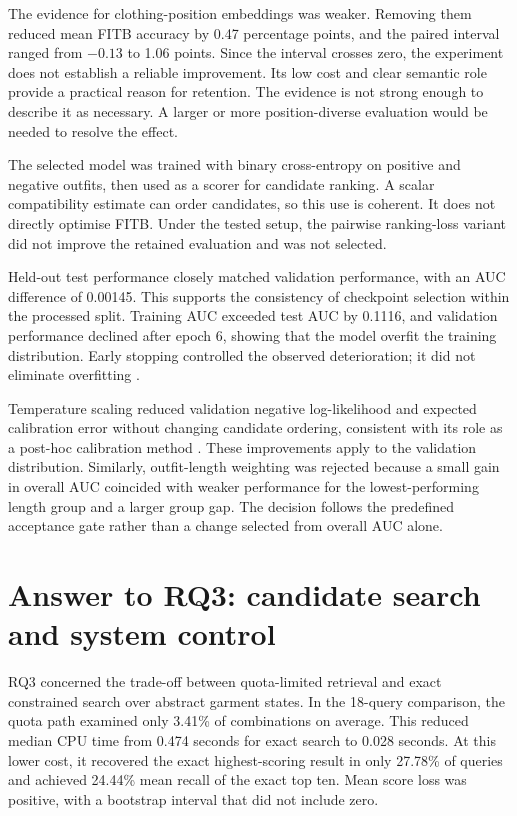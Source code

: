 The evidence for clothing-position embeddings was weaker. Removing them
reduced mean FITB accuracy by 0.47 percentage points, and the paired interval
ranged from $-0.13$ to 1.06 points. Since the interval crosses zero, the
experiment does not establish a reliable improvement. Its low cost and clear
semantic role provide a practical reason for retention. The evidence is not
strong enough to describe it as necessary. A larger or more position-diverse
evaluation would be needed to resolve the effect.

The selected model was trained with binary cross-entropy on positive and
negative outfits, then used as a scorer for candidate ranking. A scalar
compatibility estimate can order candidates, so this use is coherent. It does
not directly optimise FITB. Under the tested setup, the pairwise ranking-loss
variant did not improve the retained evaluation and was not selected.

Held-out test performance closely matched validation performance, with an AUC
difference of 0.00145. This supports the consistency of checkpoint selection
within the processed split. Training AUC exceeded test
AUC by 0.1116, and validation performance declined after epoch 6, showing that
the model overfit the training distribution. Early stopping controlled the
observed deterioration; it did not eliminate overfitting
\parencite{prechelt1998early}.

Temperature scaling reduced validation negative log-likelihood and expected
calibration error without changing candidate ordering, consistent with its
role as a post-hoc calibration method \parencite{guo2017calibration}. These
improvements apply to the validation distribution. Similarly,
outfit-length weighting was rejected because a small gain in overall AUC
coincided with weaker performance for the lowest-performing length group and a
larger group gap. The decision follows the predefined acceptance gate rather
than a change selected from overall AUC alone.

\section{Answer to RQ3: candidate search and system control}

RQ3 concerned the trade-off between quota-limited retrieval and exact
constrained search over abstract garment states. In the 18-query comparison,
the quota path examined only 3.41\% of combinations on average. This reduced
median CPU time from 0.474 seconds for exact search to 0.028 seconds. At this
lower cost, it recovered the exact highest-scoring result in only 27.78\% of queries and
achieved 24.44\% mean recall of the exact top ten. Mean score loss was positive,
with a bootstrap interval that did not include zero.

